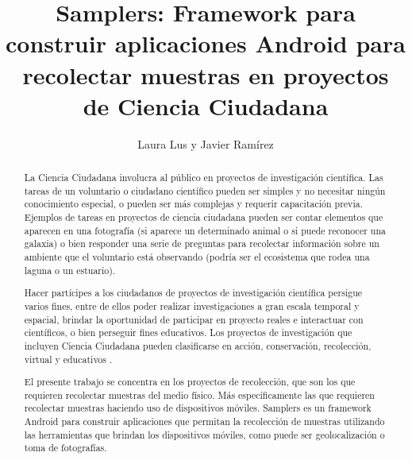 \documentclass[11pt]{report}
\begin{document}
\title{Samplers: Framework para construir aplicaciones Android para recolectar muestras en proyectos de Ciencia Ciudadana}
\author{Laura Lus y Javier Ramírez}

\maketitle

\begin{abstract}


La Ciencia Ciudadana involucra al público en proyectos de investigación científica. Las tareas de un voluntario o ciudadano científico pueden ser simples y no necesitar ningún conocimiento especial, o pueden ser más complejas y requerir capacitación previa. Ejemplos de tareas en proyectos de ciencia ciudadana pueden ser contar elementos que aparecen en una fotografía (si aparece un determinado animal o si puede reconocer una galaxia) o bien responder una serie de preguntas para recolectar información sobre un ambiente que el voluntario está observando (podría ser el ecosistema que rodea una laguna o un estuario). 

Hacer partícipes a los ciudadanos de proyectos de investigación científica persigue varios fines, entre de ellos poder realizar investigaciones a gran escala temporal y espacial\cite{bonney2009citizen}, brindar la oportunidad de participar en proyecto reales e interactuar con científicos, o bien perseguir fines educativos. Los proyectos de investigación que incluyen Ciencia Ciudadana pueden clasificarse en acción, conservación, recolección, virtual y educativos \cite{wiggins2011conservation}. 

El presente trabajo se concentra en los proyectos de recolección, que son los que requieren recolectar muestras del medio físico. Más específicamente las que requieren recolectar muestras haciendo uso de dispositivos móviles. 
Samplers es un framework Android para construir aplicaciones que permitan la recolección de muestras utilizando las herramientas que brindan los dispositivos móviles, como puede ser geolocalización o toma de fotografías.

\end{abstract}
\end{document}
